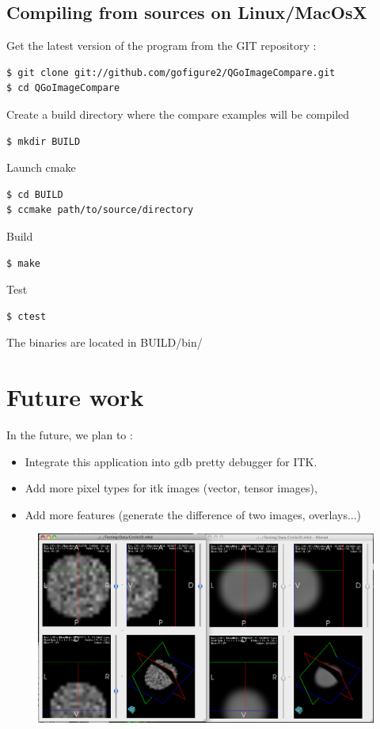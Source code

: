 \documentclass{InsightArticle}
\begin{document}
\subsection*{Compiling from sources on Linux/MacOsX}
Get the latest version of the program from the GIT repository :
\begin{lstlisting}[language=ksh,numbers=none,captionpos=none]
$ git clone git://github.com/gofigure2/QGoImageCompare.git 
$ cd QGoImageCompare
\end{lstlisting}
Create a build directory where the compare examples will be compiled
\begin{lstlisting}[language=ksh,numbers=none,captionpos=none]
$ mkdir BUILD
\end{lstlisting}
Launch cmake
\begin{lstlisting}[language=ksh,numbers=none,captionpos=none]
$ cd BUILD
$ ccmake path/to/source/directory
\end{lstlisting}
Build
\begin{lstlisting}[language=ksh,numbers=none,captionpos=none]
$ make
\end{lstlisting}
Test
\begin{lstlisting}[language=ksh,numbers=none,captionpos=none]
$ ctest
\end{lstlisting}
The binaries are located in BUILD/bin/ 

\section{Future work}
In the future, we plan to :
\begin{itemize}
  \item Integrate this application into gdb pretty debugger for ITK.
  \item Add more pixel types for itk images (vector, tensor images),
  \item Add more features (generate the difference of two images, overlays...)
\end{itemize}

\begin{figure}[p]
\center
\includegraphics[width=1\textwidth]{images/quadcompare}
\label{fig:ImageCompareGUIquad}
\end{figure}
\end{document}
